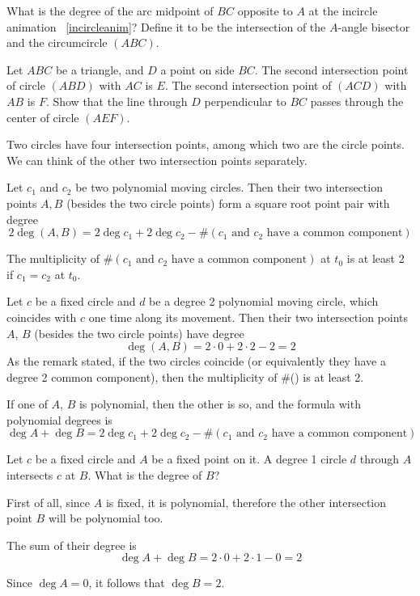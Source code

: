 \documentclass[a4paper]{article}
\begin{document}
\begin{exercise}
    What is the degree of the arc midpoint of $BC$ opposite to $A$ at the incircle animation ~\ref{incircleanim}? Define it to be the intersection of the $A$-angle bisector and the circumcircle $(ABC)$.
\end{exercise}

\begin{exercise}
    Let $ABC$ be a triangle, and $D$ a point on side $BC$. The second intersection point of circle $(ABD)$ with $AC$ is $E$. The second intersection point of $(ACD)$ with $AB$ is $F$. Show that the line through $D$ perpendicular to $BC$ passes through the center of circle $(AEF)$.
\end{exercise}

Two circles have four intersection points, among which two are the circle points. We can think of the other two intersection points separately.

\begin{theorem}
    Let $c_1$ and $c_2$ be two polynomial moving circles. Then their two intersection points $A,B$ (besides the two circle points) form a square root point pair with degree
    $$2\deg (A,B)=2\deg c_1 + 2\deg c_2-\#(\text{$c_1$ and $c_2$ have a common component})$$
\end{theorem}
\begin{remark}
    The multiplicity of $\#(\text{$c_1$ and $c_2$ have a common component})$ at $t_0$ is at least 2 if $c_1=c_2$ at $t_0$.
\end{remark}
\begin{example}
    Let $c$ be a fixed circle and $d$ be a degree 2 polynomial moving circle, which coincides with $c$ one time along its movement. Then their two intersection points $A$, $B$ (besides the two circle points) have degree
    $$\deg (A,B)=2\cdot 0+2\cdot 2 - 2=2$$
    As the remark stated, if the two circles coincide (or equivalently they have a degree 2 common component), then the multiplicity of \#() is at least 2.
\end{example}
\begin{remark}
    If one of $A$, $B$ is polynomial, then the other is so, and the formula with polynomial degrees is
    $$\deg A+\deg B= 2\deg c_1 + 2\deg c_2-\#(\text{$c_1$ and $c_2$ have a common component})$$
\end{remark}


\begin{example}
    Let $c$ be a fixed circle and $A$ be a fixed point on it. A degree 1 circle $d$ through $A$ intersects $c$ at $B$. What is the degree of $B$?

    First of all, since $A$ is fixed, it is polynomial, therefore the other intersection point $B$ will be polynomial too.

    The sum of their degree is
    $$\deg A+\deg B=2\cdot 0+2\cdot 1-0=2$$

    Since $\deg A=0$, it follows that $\deg B=2$.
\end{example}
\end{document}
